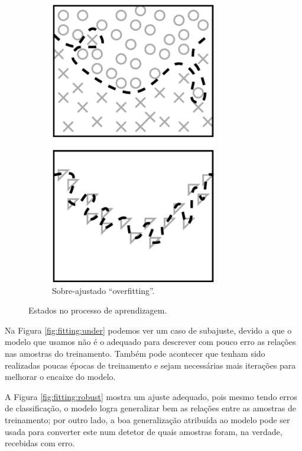 \begin{figure}[!h]
\begin{subfigure}[b]{0.3\textwidth}
         \includegraphics[width=0.8\textwidth]{chapters/cap-learning/fitting-over.eps} 
         \caption{Sobre-ajustado ``overfitting''.}
         \label{fig:fitting:over}
     \end{subfigure}
  \caption{Estados no processo de  aprendizagem.}
\label{fig:fitting}
\end{figure}

Na Figura \ref{fig:fitting:under} podemos ver um caso de subajuste, devido 
a que o modelo que usamos não é o adequado para descrever com pouco erro as relações 
nas amostras do treinamento. 
Também pode acontecer que tenham sido realizadas poucas épocas de treinamento 
e sejam necessárias mais iterações para melhorar o encaixe do modelo.  

A Figura \ref{fig:fitting:robust} mostra um ajuste adequado,
pois mesmo tendo erros de classificação, o modelo logra generalizar bem
as relações entre as amostras de treinamento; 
por outro lado, a boa generalização atribuída ao modelo
pode ser usada para converter este num detetor de quais amostras foram, na verdade, recebidas com erro.

